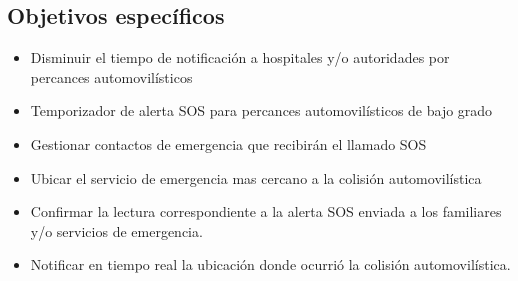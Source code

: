 \subsection{Objetivos específicos}
\begin{itemize}
	\item Disminuir el tiempo de notificación a hospitales y/o autoridades por percances automovilísticos
	\item Temporizador de alerta SOS para percances automovilísticos de bajo grado
	\item Gestionar contactos de emergencia que recibirán el llamado SOS
	\item Ubicar el servicio de emergencia mas cercano a la colisión automovilística
	\item Confirmar la lectura correspondiente a la alerta SOS enviada a los familiares y/o servicios de emergencia.
	\item Notificar en tiempo real la ubicación donde ocurrió la colisión automovilística.
\end{itemize}

